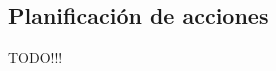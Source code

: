 \documentclass[9pt, handout]{beamer}
\begin{document}
    \subsection{Planificación de acciones}
      \begin{frame}{TODO!!!}
      \end{frame}
            
%    
\end{document}
